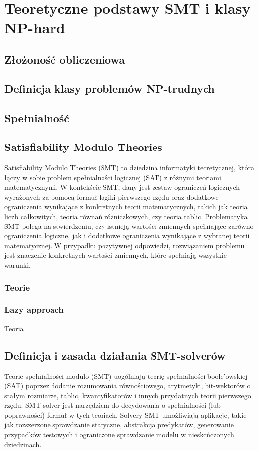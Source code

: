 \chapter{Teoretyczne podstawy SMT i klasy NP-hard}
\section{Złożoność obliczeniowa}

\section{Definicja klasy problemów NP-trudnych}

\section{Spełnialność}


\section{Satisfiability Modulo Theories}
	Satisfiability Modulo Theories (SMT) to dziedzina informatyki teoretycznej, która łączy w sobie problem spełnialności logicznej (SAT) z różnymi teoriami matematycznymi. 
	W kontekście SMT, dany jest zestaw ograniczeń logicznych wyrażonych za pomocą formuł logiki pierwszego rzędu oraz dodatkowe ograniczenia wynikające z konkretnych teorii matematycznych, takich jak teoria liczb całkowitych, teoria równań różniczkowych, czy teoria tablic.
	Problematyka SMT polega na stwierdzeniu, czy istnieją wartości zmiennych spełniające zarówno ograniczenia logiczne, jak i dodatkowe ograniczenia wynikające z wybranej teorii matematycznej. W przypadku pozytywnej odpowiedzi, rozwiązaniem problemu jest znaczenie konkretnych wartości zmiennych, które spełniają wszystkie warunki.
	\subsection{Teorie}
	\subsection{Lazy approach}
	Teoria 
\section{Definicja i zasada działania SMT-solverów}
Teorie spełnialności modulo (SMT) uogólniają teorię spełnialności boole'owskiej (SAT) poprzez dodanie rozumowania równościowego, arytmetyki, bit-wektorów o stałym rozmiarze, tablic, kwantyfikatorów i innych przydatnych teorii pierwszego rzędu.
SMT solver jest narzędziem do decydowania o spełnialności (lub poprawności) formuł w tych teoriach. 
Solvery SMT umożliwiają aplikacje, takie jak rozszerzone sprawdzanie statyczne, abstrakcja predykatów, generowanie przypadków testowych i ograniczone sprawdzanie modelu w nieskończonych dziedzinach.


